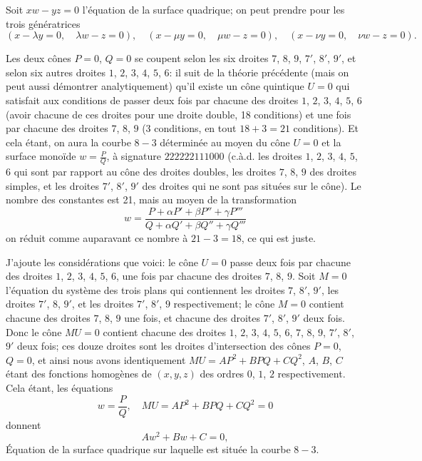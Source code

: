\documentclass[11pt,a4paper]{article}
\begin{document}
Soit $xw - yz = 0$ l'\'{e}quation de la surface quadrique; on peut prendre pour les trois g\'{e}n\'{e}ratrices
\[
(x - \lambda y = 0, \quad \lambda w - z = 0), \quad (x - \mu y = 0, \quad \mu w - z = 0), \quad (x - \nu y = 0, \quad \nu w - z = 0).
\]

\clearpage

Les deux c\^{o}nes $P = 0$, $Q = 0$ se coupent selon les six droites $7$, $8$, $9$, $7'$, $8'$, $9'$, et selon six autres droites $1$, $2$, $3$, $4$, $5$, $6$: il suit de la th\'{e}orie pr\'{e}c\'{e}dente (mais on peut aussi d\'{e}montrer analytiquement) qu'il existe un c\^{o}ne quintique $U = 0$ qui satisfait aux conditions de passer deux fois par chacune des droites $1$, $2$, $3$, $4$, $5$, $6$ (avoir chacune de ces droites pour une droite double, 18 conditions) et une fois par chacune des droites $7$, $8$, $9$ (3 conditions, en tout $18 + 3 = 21$ conditions). Et cela \'{e}tant, on aura la courbe $8 - 3$ d\'{e}termin\'{e}e au moyen du c\^{o}ne $U = 0$ et la surface mono\"{i}de $w = \frac{P}{Q}$, \`{a} signature $222222111000$ (c.\-\`{a}.\-d. les droites $1$, $2$, $3$, $4$, $5$, $6$ qui sont par rapport au c\^{o}ne des droites doubles, les droites $7$, $8$, $9$ des droites simples, et les droites $7'$, $8'$, $9'$ des droites qui ne sont pas situ\'{e}es sur le c\^{o}ne). Le nombre des constantes est 21, mais au moyen de la transformation
\[
w = \frac{P + \alpha P' + \beta P'' + \gamma P'''}{Q + \alpha Q' + \beta Q'' + \gamma Q'''}
\]
on r\'{e}duit comme auparavant ce nombre \`{a} $21 - 3 = 18$, ce qui est juste.

J'ajoute les consid\'{e}rations que voici: le c\^{o}ne $U = 0$ passe deux fois par chacune des droites $1$, $2$, $3$, $4$, $5$, $6$, une fois par chacune des droites $7$, $8$, $9$. Soit $M = 0$ l'\'{e}quation du syst\`{e}me des trois plans qui contiennent les droites $7$, $8'$, $9'$, les droites $7'$, $8$, $9'$, et les droites $7'$, $8'$, $9$ respectivement; le c\^{o}ne $M = 0$ contient chacune des droites $7$, $8$, $9$ une fois, et chacune des droites $7'$, $8'$, $9'$ deux fois. Donc le c\^{o}ne $MU = 0$ contient chacune des droites $1$, $2$, $3$, $4$, $5$, $6$, $7$, $8$, $9$, $7'$, $8'$, $9'$ deux fois; ces douze droites sont les droites d'intersection des c\^{o}nes $P = 0$, $Q = 0$, et ainsi nous avons identiquement $MU = AP^2 + BPQ + CQ^2$, $A$, $B$, $C$ \'{e}tant des fonctions homog\`{e}nes de $(x, y, z)$ des ordres $0$, $1$, $2$ respectivement. Cela \'{e}tant, les \'{e}quations
\[
w = \frac{P}{Q}, \quad MU = AP^2 + BPQ + CQ^2 = 0
\]
donnent
\[
Aw^2 + Bw + C = 0,
\]
\'{E}quation de la surface quadrique sur laquelle est situ\'{e}e la courbe $8 - 3$.
\end{document}
